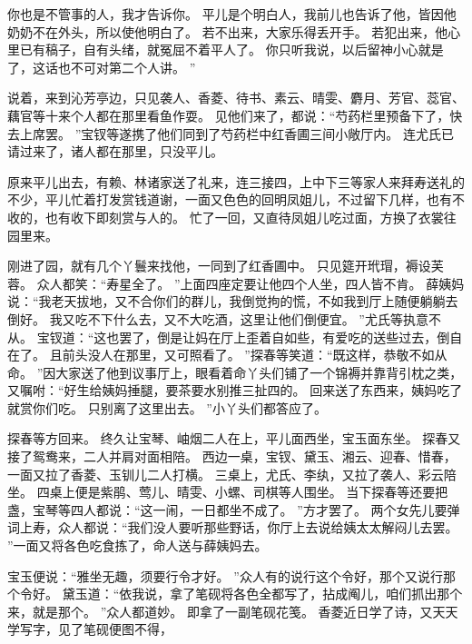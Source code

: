 你也是不管事的人，我才告诉你。
平儿是个明白人，我前儿也告诉了他，皆因他奶奶不在外头，所以使他明白了。
若不出来，大家乐得丢开手。
若犯出来，他心里已有稿子，自有头绪，就冤屈不着平人了。
你只听我说，以后留神小心就是了，这话也不可对第二个人讲。
”\par
说着，来到沁芳亭边，只见袭人、香菱、待书、素云、晴雯、麝月、芳官、蕊官、藕官等十来个人都在那里看鱼作耍。
见他们来了，都说：“芍药栏里预备下了，快去上席罢。
”宝钗等遂携了他们同到了芍药栏中红香圃三间小敞厅内。
连尤氏已请过来了，诸人都在那里，只没平儿。
\par
原来平儿出去，有赖、林诸家送了礼来，连三接四，上中下三等家人来拜寿送礼的不少，平儿忙着打发赏钱道谢，一面又色色的回明凤姐儿，不过留下几样，也有不收的，也有收下即刻赏与人的。
忙了一回，又直待凤姐儿吃过面，方换了衣裳往园里来。
\par
刚进了园，就有几个丫鬟来找他，一同到了红香圃中。
只见筵开玳瑁，褥设芙蓉。
众人都笑：“寿星全了。
”上面四座定要让他四个人坐，四人皆不肯。
薛姨妈说：“我老天拔地，又不合你们的群儿，我倒觉拘的慌，不如我到厅上随便躺躺去倒好。
我又吃不下什么去，又不大吃酒，这里让他们倒便宜。
”尤氏等执意不从。
宝钗道：“这也罢了，倒是让妈在厅上歪着自如些，有爱吃的送些过去，倒自在了。
且前头没人在那里，又可照看了。
”探春等笑道：“既这样，恭敬不如从命。
”因大家送了他到议事厅上，眼看着命丫头们铺了一个锦褥并靠背引枕之类，又嘱咐：“好生给姨妈捶腿，要茶要水别推三扯四的。
回来送了东西来，姨妈吃了就赏你们吃。
只别离了这里出去。
”小丫头们都答应了。
\par
探春等方回来。
终久让宝琴、岫烟二人在上，平儿面西坐，宝玉面东坐。
探春又接了鸳鸯来，二人并肩对面相陪。
西边一桌，宝钗、黛玉、湘云、迎春、惜春，一面又拉了香菱、玉钏儿二人打横。
三桌上，尤氏、李纨，又拉了袭人、彩云陪坐。
四桌上便是紫鹃、莺儿、晴雯、小螺、司棋等人围坐。
当下探春等还要把盏，宝琴等四人都说：“这一闹，一日都坐不成了。
”方才罢了。
两个女先儿要弹词上寿，众人都说：“我们没人要听那些野话，你厅上去说给姨太太解闷儿去罢。
”一面又将各色吃食拣了，命人送与薛姨妈去。
\par
宝玉便说：“雅坐无趣，须要行令才好。
”众人有的说行这个令好，那个又说行那个令好。
黛玉道：“依我说，拿了笔砚将各色全都写了，拈成阄儿，咱们抓出那个来，就是那个。
”众人都道妙。
即拿了一副笔砚花笺。
香菱近日学了诗，又天天学写字，见了笔砚便图不得，
